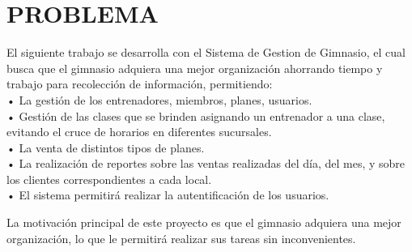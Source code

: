\section{PROBLEMA} 

\par El siguiente trabajo se desarrolla con el Sistema de Gestion de Gimnasio, el cual  busca que el gimnasio adquiera una mejor organización ahorrando tiempo y trabajo para recolección de información, permitiendo: \\
•	La gestión de los entrenadores, miembros, planes, usuarios.\\
•	Gestión de las clases que se brinden asignando un entrenador a una clase, evitando el cruce de horarios en diferentes sucursales.\\
•	La venta de distintos tipos de planes.\\
•	La realización de reportes sobre las ventas realizadas del día, del mes, y sobre los clientes correspondientes a cada local.\\
•	El sistema permitirá realizar la autentificación de los usuarios.\\

\par La motivación principal de este proyecto es que el gimnasio adquiera una mejor organización, lo que le permitirá realizar sus tareas sin inconvenientes.
